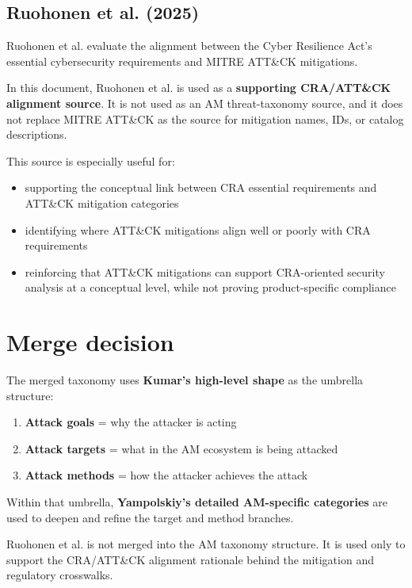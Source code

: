 \documentclass[10pt,a4paper,oneside]{report}
\begin{document}
\section{Ruohonen et al. (2025)}


Ruohonen et al. evaluate the alignment between the Cyber Resilience Act's essential cybersecurity requirements and MITRE ATT\&CK mitigations.

In this document, Ruohonen et al. is used as a \textbf{supporting CRA/ATT\&CK alignment source}. It is not used as an AM threat-taxonomy source, and it does not replace MITRE ATT\&CK as the source for mitigation names, IDs, or catalog descriptions.

This source is especially useful for:

\begin{itemize}
\item supporting the conceptual link between CRA essential requirements and ATT\&CK mitigation categories
\item identifying where ATT\&CK mitigations align well or poorly with CRA requirements
\item reinforcing that ATT\&CK mitigations can support CRA-oriented security analysis at a conceptual level, while not proving product-specific compliance
\end{itemize}


\chapter{Merge decision}


The merged taxonomy uses \textbf{Kumar's high-level shape} as the umbrella structure:

\begin{enumerate}
\item \textbf{Attack goals} = why the attacker is acting
\item \textbf{Attack targets} = what in the AM ecosystem is being attacked
\item \textbf{Attack methods} = how the attacker achieves the attack
\end{enumerate}

Within that umbrella, \textbf{Yampolskiy's detailed AM-specific categories} are used to deepen and refine the target and method branches.

Ruohonen et al. is not merged into the AM taxonomy structure. It is used only to support the CRA/ATT\&CK alignment rationale behind the mitigation and regulatory crosswalks.
\end{document}
